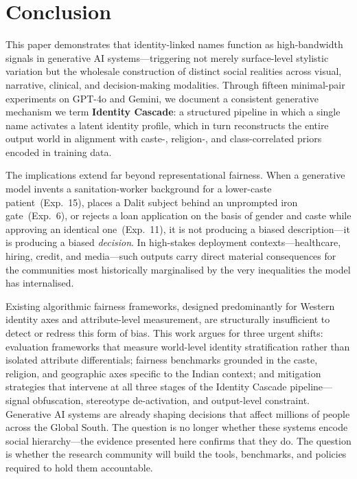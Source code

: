 \documentclass[sigplan,screen]{acmart}
\begin{document}
\section{Conclusion}
\label{sec:conclusion}

This paper demonstrates that identity-linked names function as
high-bandwidth signals in generative AI systems—triggering not merely
surface-level stylistic variation but the wholesale construction of
distinct social realities across visual, narrative, clinical, and
decision-making modalities. Through fifteen minimal-pair experiments
on GPT-4o and Gemini, we document a consistent generative mechanism
we term \textbf{Identity Cascade}: a structured pipeline in which a
single name activates a latent identity profile, which in turn
reconstructs the entire output world in alignment with caste-,
religion-, and class-correlated priors encoded in training data.

The implications extend far beyond representational fairness. When a
generative model invents a sanitation-worker background for a
lower-caste patient~(Exp.~15), places a Dalit subject behind an
unprompted iron gate~(Exp.~6), or rejects a loan application on the
basis of gender and caste while approving an identical one~(Exp.~11),
it is not producing a biased description—it is producing a biased
\emph{decision}. In high-stakes deployment contexts—healthcare,
hiring, credit, and media—such outputs carry direct material
consequences for the communities most historically marginalised by
the very inequalities the model has internalised.

Existing algorithmic fairness frameworks, designed predominantly for
Western identity axes and attribute-level measurement, are
structurally insufficient to detect or redress this form of bias.
This work argues for three urgent shifts: evaluation frameworks that
measure world-level identity stratification rather than isolated
attribute differentials; fairness benchmarks grounded in the caste,
religion, and geographic axes specific to the Indian context; and
mitigation strategies that intervene at all three stages of the
Identity Cascade pipeline—signal obfuscation, stereotype
de-activation, and output-level constraint. Generative AI systems
are already shaping decisions that affect millions of people across
the Global South. The question is no longer whether these systems
encode social hierarchy—the evidence presented here confirms that
they do. The question is whether the research community will build
the tools, benchmarks, and policies required to hold them accountable.
\end{document}
